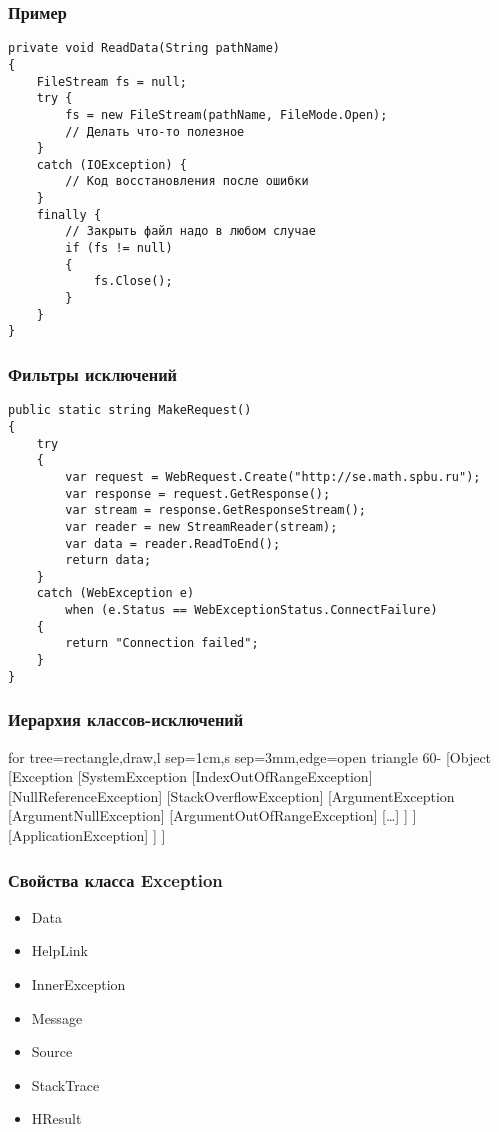 \documentclass[xetex,mathserif,serif]{beamer}
\begin{document}
	\begin{frame}[fragile]
		\frametitle{Пример}
		\begin{small}
			\begin{verbatim}
private void ReadData(String pathName) 
{
    FileStream fs = null;
    try {
        fs = new FileStream(pathName, FileMode.Open);
        // Делать что-то полезное
    }
    catch (IOException) {
        // Код восстановления после ошибки
    }
    finally {
        // Закрыть файл надо в любом случае
        if (fs != null) 
        {
            fs.Close();
        }
    }
}
			\end{verbatim}
		\end{small}
	\end{frame}

	\begin{frame}[fragile]
		\frametitle{Фильтры исключений}
		\begin{small}
			\begin{verbatim}
public static string MakeRequest()
{
    try
    {
        var request = WebRequest.Create("http://se.math.spbu.ru");
        var response = request.GetResponse();
        var stream = response.GetResponseStream();
        var reader = new StreamReader(stream);
        var data = reader.ReadToEnd();
        return data;
    }
    catch (WebException e) 
        when (e.Status == WebExceptionStatus.ConnectFailure)
    {
        return "Connection failed";
    }
}
			\end{verbatim}
		\end{small}
	\end{frame}

	\begin{frame}
		\frametitle{Иерархия классов-исключений}
		\begin{tiny}
			\begin{forest}
				for tree={rectangle,draw,l sep=1cm,s sep=3mm,edge=open triangle 60-}
				[Object
					[Exception
						[SystemException
							[IndexOutOfRangeException]
							[NullReferenceException]
							[StackOverflowException]
							[ArgumentException
								[ArgumentNullException]
								[ArgumentOutOfRangeException]
								[\dots]
							]
						]
						[ApplicationException]
					]
				]
			\end{forest}
		\end{tiny}
	\end{frame}

	\begin{frame}[fragile]
		\frametitle{Свойства класса Exception}
		\begin{itemize}
			\item Data
			\item HelpLink
			\item InnerException
			\item Message
			\item Source
			\item StackTrace
			\item HResult
		\end{itemize}
	\end{frame}
\end{document}
